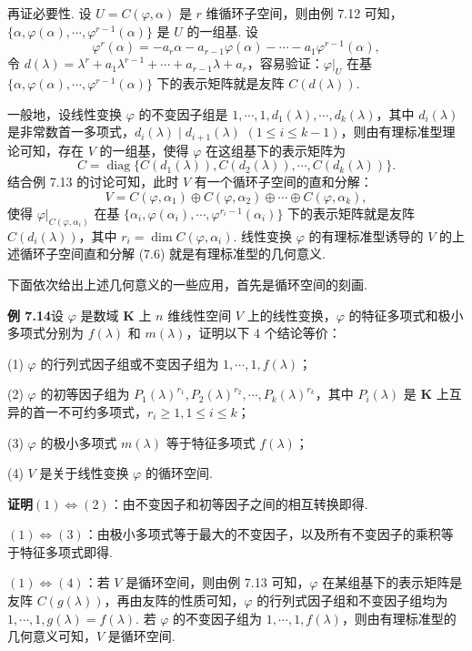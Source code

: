 \documentclass[UTF8,12pt,a4paper,fontset=fandol]{ctexart}
\begin{document}
再证必要性. 设 $U=C(\varphi,\alpha)$ 是 $r$ 维循环子空间，则由例 7.12 可知，$\{\alpha,\varphi(\alpha),\cdots,\varphi^{r-1}(\alpha)\}$ 是 $U$ 的一组基. 设
\[
\varphi^r(\alpha)=-a_r\alpha-a_{r-1}\varphi(\alpha)-\cdots-a_1\varphi^{r-1}(\alpha),
\]
令 $d(\lambda)=\lambda^r+a_1\lambda^{r-1}+\cdots+a_{r-1}\lambda+a_r$，容易验证：$\varphi|_U$ 在基 $\{\alpha,\varphi(\alpha),\cdots,\varphi^{r-1}(\alpha)\}$ 下的表示矩阵就是友阵 $C(d(\lambda))$.

一般地，设线性变换 $\varphi$ 的不变因子组是 $1,\cdots,1,d_1(\lambda),\cdots,d_k(\lambda)$，其中 $d_i(\lambda)$ 是非常数首一多项式，$d_i(\lambda)\mid d_{i+1}(\lambda)$ $(1\le i\le k-1)$，则由有理标准型理论可知，存在 $V$ 的一组基，使得 $\varphi$ 在这组基下的表示矩阵为
\[
C=\operatorname{diag}\{C(d_1(\lambda)),C(d_2(\lambda)),\cdots,C(d_k(\lambda))\}.
\]
结合例 7.13 的讨论可知，此时 $V$ 有一个循环子空间的直和分解：
\begin{equation}
V=C(\varphi,\alpha_1)\oplus C(\varphi,\alpha_2)\oplus\cdots\oplus C(\varphi,\alpha_k),
\tag{7.6}
\end{equation}
使得 $\varphi|_{C(\varphi,\alpha_i)}$ 在基 $\{\alpha_i,\varphi(\alpha_i),\cdots,\varphi^{r_i-1}(\alpha_i)\}$ 下的表示矩阵就是友阵 $C(d_i(\lambda))$，其中 $r_i=\dim C(\varphi,\alpha_i)$. 线性变换 $\varphi$ 的有理标准型诱导的 $V$ 的上述循环子空间直和分解 (7.6) 就是有理标准型的几何意义.

下面依次给出上述几何意义的一些应用，首先是循环空间的刻画.

\noindent\textbf{例 7.14}\quad 设 $\varphi$ 是数域 $\mathbf{K}$ 上 $n$ 维线性空间 $V$ 上的线性变换，$\varphi$ 的特征多项式和极小多项式分别为 $f(\lambda)$ 和 $m(\lambda)$，证明以下 4 个结论等价：

(1) $\varphi$ 的行列式因子组或不变因子组为 $1,\cdots,1,f(\lambda)$；

(2) $\varphi$ 的初等因子组为 $P_1(\lambda)^{r_1},P_2(\lambda)^{r_2},\cdots,P_k(\lambda)^{r_k}$，其中 $P_i(\lambda)$ 是 $\mathbf{K}$ 上互异的首一不可约多项式，$r_i\ge 1,1\le i\le k$；

(3) $\varphi$ 的极小多项式 $m(\lambda)$ 等于特征多项式 $f(\lambda)$；

(4) $V$ 是关于线性变换 $\varphi$ 的循环空间.

\noindent\textbf{证明}\quad $(1)\Leftrightarrow(2)$：由不变因子和初等因子之间的相互转换即得.

$(1)\Leftrightarrow(3)$：由极小多项式等于最大的不变因子，以及所有不变因子的乘积等于特征多项式即得.

$(1)\Leftrightarrow(4)$：若 $V$ 是循环空间，则由例 7.13 可知，$\varphi$ 在某组基下的表示矩阵是友阵 $C(g(\lambda))$，再由友阵的性质可知，$\varphi$ 的行列式因子组和不变因子组均为 $1,\cdots,1,g(\lambda)=f(\lambda)$. 若 $\varphi$ 的不变因子组为 $1,\cdots,1,f(\lambda)$，则由有理标准型的几何意义可知，$V$ 是循环空间.
\end{document}
